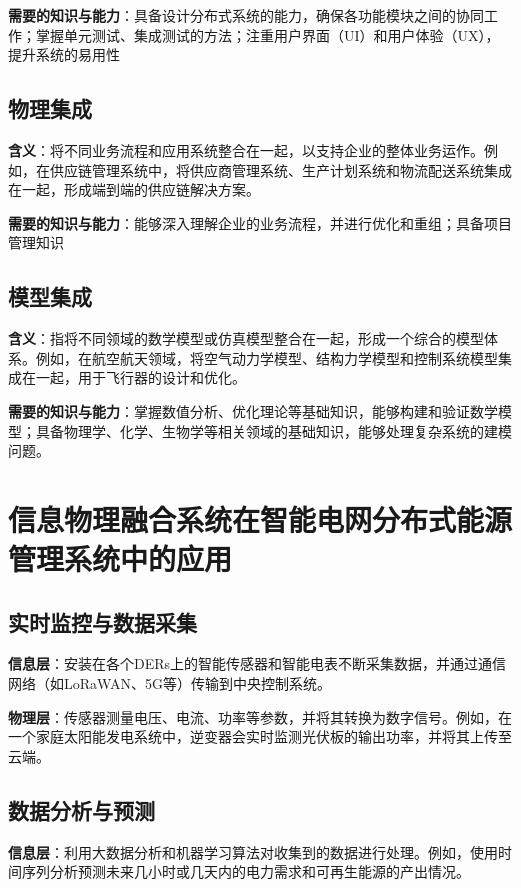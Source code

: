 \documentclass[UTF8,a4paper]{ctexart}
\begin{document}
	\textbf{需要的知识与能力}：具备设计分布式系统的能力，确保各功能模块之间的协同工作；掌握单元测试、集成测试的方法；注重用户界面（UI）和用户体验（UX），提升系统的易用性
    
    
    \subsection{物理集成}
	\textbf{含义}：将不同业务流程和应用系统整合在一起，以支持企业的整体业务运作。例如，在供应链管理系统中，将供应商管理系统、生产计划系统和物流配送系统集成在一起，形成端到端的供应链解决方案。
	
	\textbf{需要的知识与能力}：能够深入理解企业的业务流程，并进行优化和重组；具备项目管理知识


    \subsection{模型集成}
	\textbf{含义}：指将不同领域的数学模型或仿真模型整合在一起，形成一个综合的模型体系。例如，在航空航天领域，将空气动力学模型、结构力学模型和控制系统模型集成在一起，用于飞行器的设计和优化。
	
	\textbf{需要的知识与能力}：掌握数值分析、优化理论等基础知识，能够构建和验证数学模型；具备物理学、化学、生物学等相关领域的基础知识，能够处理复杂系统的建模问题。

    \newpage

    \section{信息物理融合系统在智能电网分布式能源管理系统中的应用}
	
	\subsection{实时监控与数据采集}
	\textbf{信息层}：安装在各个DERs上的智能传感器和智能电表不断采集数据，并通过通信网络（如LoRaWAN、5G等）传输到中央控制系统。
	
	\textbf{物理层}：传感器测量电压、电流、功率等参数，并将其转换为数字信号。例如，在一个家庭太阳能发电系统中，逆变器会实时监测光伏板的输出功率，并将其上传至云端。
	
		
	\subsection{数据分析与预测}
	\textbf{信息层}：利用大数据分析和机器学习算法对收集到的数据进行处理。例如，使用时间序列分析预测未来几小时或几天内的电力需求和可再生能源的产出情况。
	
\end{document}
